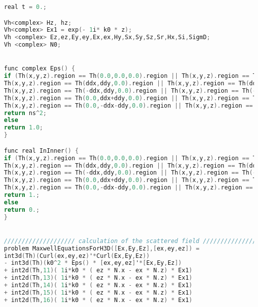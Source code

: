 \begin{lstlisting}[language=C]
real t = 0.;

Vh<complex> Hz, hz;
Vh<complex> Ex1 = exp(- 1i* k0 * z);
Vh <complex> Ez,ez,Ey,ey,Ex,ex,Hy,Sx,Sy,Sz,Sr,Hx,Si,SigmD;
Vh <complex> N0;


func complex Eps() {
if (Th(x,y,z).region == Th(0.0,0.0,0.0).region || Th(x,y,z).region == Th(ddx,0.0,0.0).region || Th(x,y,z).region == Th(-ddx,0.0,0.0).region || Th(x,y,z).region == Th(0.0, ddx, 0.0).region || Th(x,y,z).region == Th(0.0,-ddx,0.0).region ||
Th(x,y,z).region == Th(ddx,ddy,0.0).region || Th(x,y,z).region == Th(ddx+ddy,0.0,0.0).region || Th(x,y,z).region == Th(ddx,-ddy,0.0).region ||
Th(x,y,z).region == Th(-ddx,ddy,0.0).region || Th(x,y,z).region == Th(-ddx-ddy,0.0,0.0).region || Th(x,y,z).region == Th(-ddx,-ddy,0.0).region ||
Th(x,y,z).region == Th(0.0,ddx+ddy,0.0).region || Th(x,y,z).region == Th(ddy,ddx,0.0).region || Th(x,y,z).region == Th(-ddy,ddx,0.0).region ||
Th(x,y,z).region == Th(0.0,-ddx-ddy,0.0).region || Th(x,y,z).region == Th(ddy,-ddx,0.0).region || Th(x,y,z).region == Th(-ddy,-ddx,0.0).region)
return ns^2;
else 
return 1.0;
}

func real InInner() {
if (Th(x,y,z).region == Th(0.0,0.0,0.0).region || Th(x,y,z).region == Th(ddx,0.0,0.0).region || Th(x,y,z).region == Th(-ddx,0.0,0.0).region || Th(x,y,z).region == Th(0.0, ddx, 0.0).region || Th(x,y,z).region == Th(0.0,-ddx,0.0).region ||
Th(x,y,z).region == Th(ddx,ddy,0.0).region || Th(x,y,z).region == Th(ddx+ddy,0.0,0.0).region || Th(x,y,z).region == Th(ddx,-ddy,0.0).region ||
Th(x,y,z).region == Th(-ddx,ddy,0.0).region || Th(x,y,z).region == Th(-ddx-ddy,0.0,0.0).region || Th(x,y,z).region == Th(-ddx,-ddy,0.0).region ||
Th(x,y,z).region == Th(0.0,ddx+ddy,0.0).region || Th(x,y,z).region == Th(ddy,ddx,0.0).region || Th(x,y,z).region == Th(-ddy,ddx,0.0).region ||
Th(x,y,z).region == Th(0.0,-ddx-ddy,0.0).region || Th(x,y,z).region == Th(ddy,-ddx,0.0).region || Th(x,y,z).region == Th(-ddy,-ddx,0.0).region)
return 1.;
else 
return 0.;
}


//////////////////// calculation of the scattered field /////////////////////  
problem MaxwellEquationsForH3D([Ex,Ey,Ez],[ex,ey,ez]) =
int3d(Th)(Curl(ex,ey,ez)'*Curl(Ex,Ey,Ez))
- int3d(Th)(k0^2 * Eps() * [ex,ey,ez]'*[Ex,Ey,Ez])
+ int2d(Th,11)( 1i*k0 * ( ez * N.x - ex * N.z) * Ex1)
+ int2d(Th,13)( 1i*k0 * ( ez * N.x - ex * N.z) * Ex1)
+ int2d(Th,14)( 1i*k0 * ( ez * N.x - ex * N.z) * Ex1)
+ int2d(Th,15)( 1i*k0 * ( ez * N.x - ex * N.z) * Ex1)
+ int2d(Th,16)( 1i*k0 * ( ez * N.x - ex * N.z) * Ex1)


\end{lstlisting}
